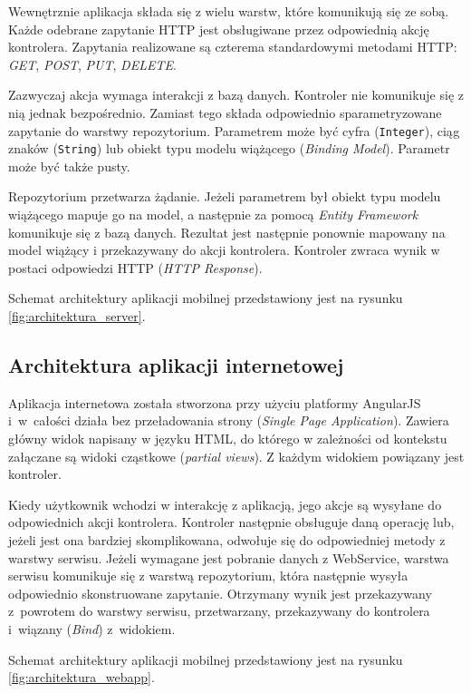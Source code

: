 \documentclass{book}
\begin{document}
			Wewnętrznie aplikacja składa się z wielu warstw, które komunikują się ze sobą. Każde odebrane zapytanie HTTP jest obsługiwane przez odpowiednią akcję kontrolera. Zapytania realizowane są czterema standardowymi metodami HTTP: \emph{GET}, \emph{POST}, \emph{PUT}, \emph{DELETE}.
			
			Zazwyczaj akcja wymaga interakcji z bazą danych. Kontroler nie komunikuje się z nią jednak bezpośrednio. Zamiast tego składa odpowiednio sparametryzowane zapytanie do warstwy repozytorium. Parametrem może być cyfra (\texttt{Integer}), ciąg znaków (\texttt{String}) lub obiekt typu modelu wiążącego (\emph{Binding Model}). Parametr może być także pusty. 
			
			Repozytorium przetwarza żądanie. Jeżeli parametrem był obiekt typu modelu wiążącego mapuje go na model, a następnie za pomocą \emph{Entity Framework} komunikuje się z bazą danych. Rezultat jest następnie ponownie mapowany na model wiążący i przekazywany do akcji kontrolera. Kontroler zwraca wynik w postaci odpowiedzi HTTP (\emph{HTTP Response}).
			
			Schemat architektury aplikacji mobilnej  przedstawiony jest na rysunku \ref{fig:architektura_server}. 			
			
			\subsection{Architektura aplikacji internetowej}		
			
			

			Aplikacja internetowa została stworzona przy użyciu platformy AngularJS i~w~całości działa bez przeładowania strony (\emph{Single Page Application}). Zawiera główny widok napisany w języku HTML, do którego w zależności od kontekstu załączane są widoki cząstkowe (\emph{partial views}). Z każdym widokiem powiązany jest kontroler. 
			
			Kiedy użytkownik wchodzi w interakcję z aplikacją, jego akcje są wysyłane do odpowiednich akcji kontrolera. Kontroler następnie obsługuje daną operację lub, jeżeli jest ona bardziej skomplikowana, odwołuje się do odpowiedniej metody z warstwy serwisu. Jeżeli wymagane jest pobranie danych z WebService, warstwa serwisu komunikuje się z warstwą repozytorium, która następnie wysyła odpowiednio skonstruowane zapytanie. Otrzymany wynik jest przekazywany z~powrotem do warstwy serwisu, przetwarzany, przekazywany do kontrolera i~wiązany (\emph{Bind}) z~widokiem.								

			Schemat architektury aplikacji mobilnej  przedstawiony jest na rysunku \ref{fig:architektura_webapp}.	
			
\end{document}
